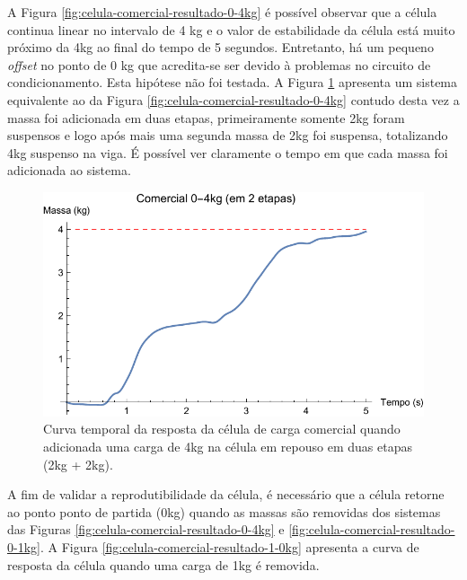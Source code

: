 \documentclass[a4paper]{instrumentacao}
\begin{document}
A Figura \ref{fig:celula-comercial-resultado-0-4kg} é possível observar que a célula continua linear no intervalo de 4 kg e o valor de estabilidade da célula está muito próximo da 4kg ao final do tempo de 5 segundos. Entretanto, há um pequeno \textit{offset} no ponto de 0 kg que acredita-se ser devido à problemas no circuito de condicionamento. Esta hipótese não foi testada. A Figura \ref{fig:celula-comercial-resultado-0-4kg-etapa} apresenta um sistema equivalente ao da Figura \ref{fig:celula-comercial-resultado-0-4kg} contudo desta vez a massa foi adicionada em duas etapas, primeiramente somente 2kg foram suspensos e logo após mais uma segunda massa de 2kg foi suspensa, totalizando 4kg suspenso na viga. É possível ver claramente o tempo em que cada massa foi adicionada ao sistema.

\begin{figure}[H]
\center
\includegraphics[width=\textwidth]{Comercial_0-4kg_etapa.pdf}
\caption{Curva temporal da resposta da célula de carga comercial quando adicionada uma carga de 4kg na célula em repouso em duas etapas (2kg + 2kg).}
\label{fig:celula-comercial-resultado-0-4kg-etapa}
\end{figure} 

A fim de validar a reprodutibilidade da célula, é necessário que a célula retorne ao ponto ponto de partida (0kg) quando as massas são removidas dos sistemas das Figuras \ref{fig:celula-comercial-resultado-0-4kg} e \ref{fig:celula-comercial-resultado-0-1kg}. A Figura \ref{fig:celula-comercial-resultado-1-0kg} apresenta a curva de resposta da célula quando uma carga de 1kg é removida.
\end{document}
